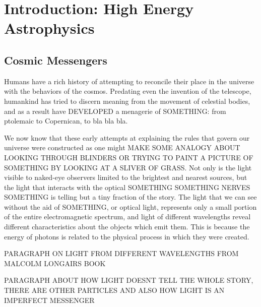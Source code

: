 \chapter{Introduction: High Energy Astrophysics}
\label{sec:intro}

\section{Cosmic Messengers}
\label{sec:intro:multimessenger}

Humans have a rich history of attempting to reconcile their place in the universe with the behaviors of the cosmos. Predating even the invention of the telescope, humankind has tried to discern meaning from the movement of celestial bodies, and as a result have DEVELOPED a menagerie of SOMETHING: from ptolemaic to Copernican, to bla bla bla.  

We now know that these early attempts at explaining the rules that govern our universe were constructed as one might MAKE SOME ANALOGY ABOUT LOOKING THROUGH BLINDERS OR TRYING TO PAINT A PICTURE OF SOMETHING BY LOOKING AT A SLIVER OF GRASS. Not only is the light visible to naked-eye observers limited to the brightest and nearest sources, but the light that interacts with the optical SOMETHING SOMETHING NERVES SOMETHING is telling but a tiny fraction of the story. The light that we can see without the aid of SOMETHING, or optical light, represents only a small portion of the entire electromagnetic spectrum, and light of different wavelengths reveal different characteristics about the objects which emit them. This is because the energy of photons is related to the physical process in which they were created. 

PARAGRAPH ON LIGHT FROM DIFFERENT WAVELENGTHS FROM MALCOLM LONGAIRS BOOK

PARAGRAPH ABOUT HOW LIGHT DOESNT TELL THE WHOLE STORY, THERE ARE OTHER PARTICLES AND ALSO HOW LIGHT IS AN IMPERFECT MESSENGER






